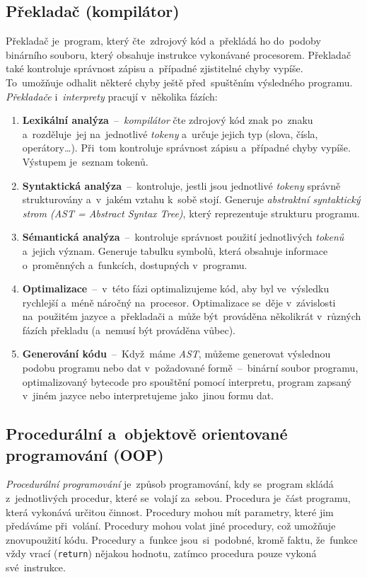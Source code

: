 \documentclass[10pt,a4paper]{article}
\begin{document}
        \subsection{Překladač (kompilátor)}
        Překladač je~program, který čte~zdrojový kód a~překládá ho do~podoby binárního souboru, který obsahuje instrukce vykonávané procesorem. Překladač také kontroluje správnost zápisu a~případné zjistitelné chyby vypíše. To~umožňuje odhalit některé chyby ještě před~spuštěním výsledného programu.
        \emph{Překladače} i~\emph{interprety} pracují v~několika fázích:
        \begin{enumerate}
            \item \textbf{Lexikální analýza}~--~\emph{kompilátor} čte zdrojový kód znak po~znaku a~rozděluje~jej na~jednotlivé \emph{tokeny} a~určuje jejich typ (slova, čísla, operátory\dots). Při~tom kontroluje správnost zápisu a~případné chyby vypíše. Výstupem je~seznam tokenů.
            \item \textbf{Syntaktická analýza}~--~kontroluje, jestli jsou jednotlivé \emph{tokeny} správně strukturovány a~v~jakém vztahu k~sobě stojí. Generuje \emph{abstraktní syntaktický strom (AST = Abstract Syntax Tree)}, který reprezentuje strukturu programu.
            \item \textbf{Sémantická analýza}~--~kontroluje správnost použití jednotlivých \emph{tokenů} a~jejich význam. Generuje tabulku symbolů, která obsahuje informace o~proměnných a~funkcích, dostupných v~programu.
            \item \textbf{Optimalizace}~--~v~této fázi optimalizujeme kód, aby byl ve~výsledku rychlejší a~méně náročný na~procesor. Optimalizace se~děje v~závislosti na~použitém jazyce a~překladači a~může být~prováděna několikrát v~různých fázích překladu (a~nemusí být prováděna vůbec).
            \item \textbf{Generování kódu}~--~Když~máme \emph{AST}, můžeme generovat výslednou podobu programu nebo dat v~požadované formě~--~binární soubor programu, optimalizovaný bytecode pro spouštění pomocí interpretu, program zapsaný v~jiném jazyce nebo interpretujeme jako~jinou formu dat.
        \end{enumerate} \cite{baeldungCompilersWork}

        \subsection{Procedurální a~objektově orientované programování (OOP)}
        \emph{Procedurální programování} je~způsob programování, kdy se~program skládá z~jednotlivých procedur, které se~volají za~sebou. Procedura je~část programu, která vykonává určitou činnost. Procedury mohou mít parametry, které jim předáváme při~volání. Procedury mohou volat jiné procedury, což umožňuje znovupoužití kódu. Procedury a~funkce jsou~si~podobné, kromě faktu, že~funkce vždy vrací (\texttt{return}) nějakou hodnotu, zatímco procedura pouze vykoná své~instrukce.
        
\end{document}
